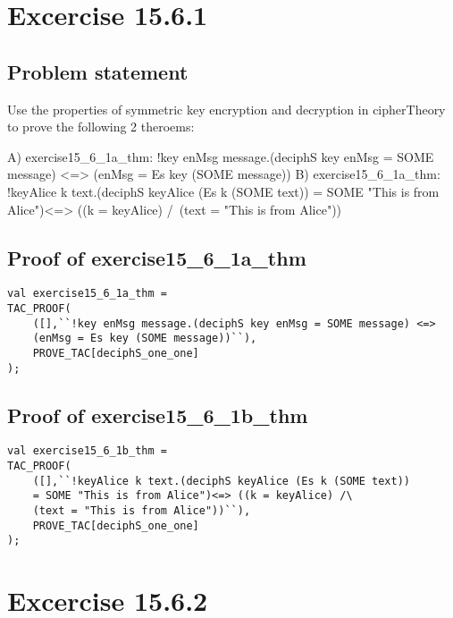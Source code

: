 \documentclass{report}
\begin{document}
\chapter{Excercise 15.6.1}
\label{cha:15-6-1}

\section{Problem statement}
\label{problem-statement-15-6-1}
Use the properties of symmetric key encryption and decryption in
cipherTheory to prove the following 2 theroems:

A) exercise15_6_1a_thm:
!key enMsg message.(deciphS key enMsg = SOME message) <=>
    (enMsg = Es key (SOME message))
B) exercise15_6_1a_thm:
!keyAlice k text.(deciphS keyAlice (Es k (SOME text)) 
    = SOME "This is from Alice")<=> ((k = keyAlice) /\ 
    (text = "This is from Alice"))

\section{Proof of exercise15_6_1a_thm}
\label{proof-15-6-1-A}
\begin{lstlisting}[frame=TBlr]
val exercise15_6_1a_thm = 
TAC_PROOF(
    ([],``!key enMsg message.(deciphS key enMsg = SOME message) <=>
    (enMsg = Es key (SOME message))``),
    PROVE_TAC[deciphS_one_one]
);
\end{lstlisting}



\section{Proof of exercise15_6_1b_thm}
\label{proof-15-6-1-B}
\begin{lstlisting}[frame=TBlr]
val exercise15_6_1b_thm =
TAC_PROOF(
    ([],``!keyAlice k text.(deciphS keyAlice (Es k (SOME text)) 
    = SOME "This is from Alice")<=> ((k = keyAlice) /\ 
    (text = "This is from Alice"))``),
    PROVE_TAC[deciphS_one_one]
);
\end{lstlisting}



\chapter{Excercise 15.6.2}
\label{cha:15-6-2}
\end{document}
